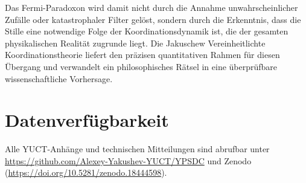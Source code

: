 \documentclass[11pt,a4paper]{article}
\begin{document}
	Das Fermi-Paradoxon wird damit nicht durch die Annahme unwahrscheinlicher Zufälle oder katastrophaler Filter gelöst, sondern durch die Erkenntnis, dass die Stille eine notwendige Folge der Koordinationsdynamik ist, die der gesamten physikalischen Realität zugrunde liegt. Die Jakuschew Vereinheitlichte Koordinationstheorie liefert den präzisen quantitativen Rahmen für diesen Übergang und verwandelt ein philosophisches Rätsel in eine überprüfbare wissenschaftliche Vorhersage.
	
	\section*{Datenverfügbarkeit}
	Alle YUCT-Anhänge und technischen Mitteilungen sind abrufbar unter \url{https://github.com/Alexey-Yakushev-YUCT/YPSDC} und Zenodo (\url{https://doi.org/10.5281/zenodo.18444598}).
	
\end{document}
